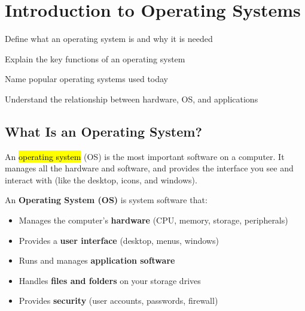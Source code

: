 
\chapter{Introduction to Operating Systems}
\label{ch:os-intro}

\begin{objectives}
  \item Define what an operating system is and why it is needed
  \item Explain the key functions of an operating system
  \item Name popular operating systems used today
  \item Understand the relationship between hardware, OS, and applications
\end{objectives}


\section{What Is an Operating System?}
\label{sec:what-is-os}

An \hl{operating system} (OS) is the most important software on a computer. It manages all the hardware and software, and provides the interface you see and interact with (like the desktop, icons, and windows).

\begin{theorybox}
An \textbf{Operating System (OS)} is system software that:
\begin{itemize}[leftmargin=*, label={\textcolor{ModuleBlue}{\faAngleRight}}, itemsep=2pt]
  \item Manages the computer's \textbf{hardware} (CPU, memory, storage, peripherals)
  \item Provides a \textbf{user interface} (desktop, menus, windows)
  \item Runs and manages \textbf{application software}
  \item Handles \textbf{files and folders} on your storage drives
  \item Provides \textbf{security} (user accounts, passwords, firewall)
\end{itemize}
\end{theorybox}

